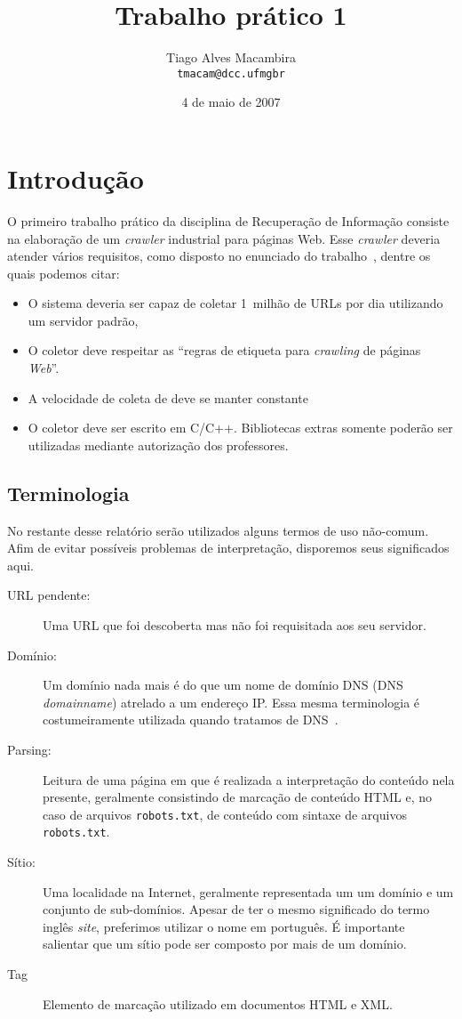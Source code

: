 \documentclass[10pt,twocolumn]{article}
\title{Trabalho prático 1}
\author{Tiago Alves Macambira \\ \texttt{tmacam@dcc.ufmgbr}}
\date{4 de maio de 2007}
\begin{document}
\maketitle

\section{Introdução}

O primeiro trabalho prático da disciplina de Recuperação de Informação
consiste na elaboração de um \emph{crawler} industrial para páginas Web.
Esse \emph{crawler} deveria atender vários requisitos, como disposto no
enunciado do trabalho~\cite{tp1}, dentre os quais podemos citar:
\begin{itemize}
\item O sistema deveria ser capaz de coletar 1~milhão de URLs por dia
utilizando um servidor padrão,
\item O coletor deve respeitar as ``regras de etiqueta para
\emph{crawling} de páginas \emph{Web}''.
\item A velocidade de coleta de deve se manter constante
\item O coletor deve ser escrito em C/C++. Bibliotecas extras somente
poderão ser utilizadas mediante autorização dos professores.
\end{itemize}

\subsection{Terminologia}

No restante desse relatório serão utilizados alguns termos de uso
não-comum. Afim de evitar possíveis problemas de interpretação,
disporemos seus significados aqui.

\begin{description}
\item[URL pendente:] Uma URL que foi descoberta mas não foi requisitada aos seu
servidor.
\item[Domínio:] Um domínio nada mais é do que um nome de domínio DNS
(DNS \emph{domainname}) atrelado a um
endereço IP. Essa mesma terminologia é costumeiramente utilizada quando
tratamos de DNS~\cite{rfc1034}.
\item[Parsing:] Leitura de uma página em que é realizada a interpretação do
conteúdo nela presente, geralmente consistindo de marcação de conteúdo HTML e,
no caso de arquivos \texttt{robots.txt}, de conteúdo com sintaxe de arquivos
\texttt{robots.txt}.
\item[Sítio:] Uma localidade na Internet, geralmente representada um um domínio
e um conjunto de sub-domínios. Apesar de ter o mesmo significado do termo
inglês \emph{site}, preferimos utilizar o nome em português. É importante
salientar que um sítio pode ser composto por mais de um domínio.
\item[Tag] Elemento de marcação utilizado em documentos HTML e XML.
\end{description}
\end{document}
